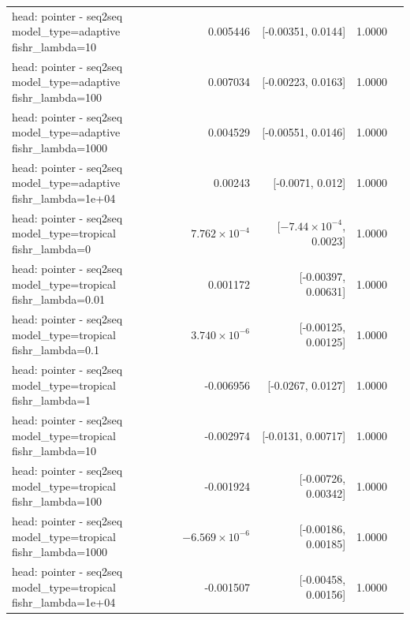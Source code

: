 \documentclass[10pt]{article}
\makeatletter
\newcommand{\stackcell}[1]{\begin{tabular}[t]{@{}l@{}}#1\end{tabular}}
\makeatother
\begin{document}
{\begin{longtable}{lrrrl}
\stackcell{head: pointer - seq2seq\\\footnotesize model\_type=adaptive fishr\_lambda=10 } & 0.005446 & [-0.00351, 0.0144] & 1.0000 & \\
\stackcell{head: pointer - seq2seq\\\footnotesize model\_type=adaptive fishr\_lambda=100 } & 0.007034 & [-0.00223, 0.0163] & 1.0000 & \\
\stackcell{head: pointer - seq2seq\\\footnotesize model\_type=adaptive fishr\_lambda=1000 } & 0.004529 & [-0.00551, 0.0146] & 1.0000 & \\
\stackcell{head: pointer - seq2seq\\\footnotesize model\_type=adaptive fishr\_lambda=1e+04 } & 0.00243 & [-0.0071, 0.012] & 1.0000 & \\
\stackcell{head: pointer - seq2seq\\\footnotesize model\_type=tropical fishr\_lambda=0 } & $7.762\times10^{-4}$ & [$-7.44\times10^{-4}$, 0.0023] & 1.0000 & \\
\stackcell{head: pointer - seq2seq\\\footnotesize model\_type=tropical fishr\_lambda=0.01 } & 0.001172 & [-0.00397, 0.00631] & 1.0000 & \\
\stackcell{head: pointer - seq2seq\\\footnotesize model\_type=tropical fishr\_lambda=0.1 } & $3.740\times10^{-6}$ & [-0.00125, 0.00125] & 1.0000 & \\
\stackcell{head: pointer - seq2seq\\\footnotesize model\_type=tropical fishr\_lambda=1 } & -0.006956 & [-0.0267, 0.0127] & 1.0000 & \\
\stackcell{head: pointer - seq2seq\\\footnotesize model\_type=tropical fishr\_lambda=10 } & -0.002974 & [-0.0131, 0.00717] & 1.0000 & \\
\stackcell{head: pointer - seq2seq\\\footnotesize model\_type=tropical fishr\_lambda=100 } & -0.001924 & [-0.00726, 0.00342] & 1.0000 & \\
\stackcell{head: pointer - seq2seq\\\footnotesize model\_type=tropical fishr\_lambda=1000 } & $-6.569\times10^{-6}$ & [-0.00186, 0.00185] & 1.0000 & \\
\stackcell{head: pointer - seq2seq\\\footnotesize model\_type=tropical fishr\_lambda=1e+04 } & -0.001507 & [-0.00458, 0.00156] & 1.0000 & \\

\end{longtable}}
\end{document}
